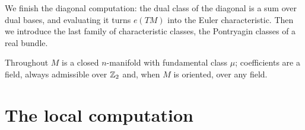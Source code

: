 \lecture

\begin{guiding}
We finish the diagonal computation: the dual class of the diagonal is a sum over
dual bases, and evaluating it turns $e(TM)$ into the Euler characteristic. Then
we introduce the last family of characteristic classes, the Pontryagin classes
of a real bundle.
\end{guiding}

Throughout $M$ is a closed $n$-manifold with fundamental class $\mu$;
coefficients are a field, always admissible over $\mathbb{Z}_2$ and, when $M$ is
oriented, over any field.

\section{The local computation}

